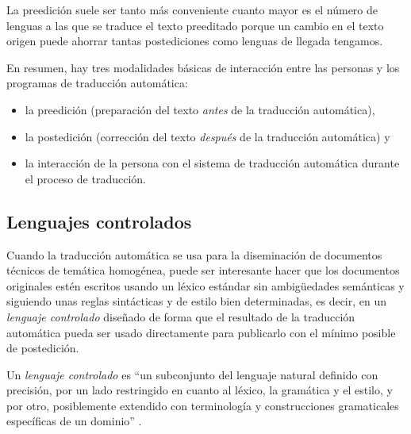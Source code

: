 La preedición suele ser tanto más conveniente cuanto mayor es el número de lenguas a las que se traduce el texto preeditado porque un cambio en el texto origen puede ahorrar tantas postediciones como lenguas de llegada tengamos. 

En resumen, hay tres modalidades básicas de interacción entre las personas y los programas de traducción automática: \begin{itemize} \item la preedición (preparación del texto \emph{antes} de la traducción automática), \item la postedición (corrección del texto \emph{después} de la traducción automática) y \item la interacción de la persona con el sistema de traducción automática durante el proceso de traducción. \end{itemize} 


\subsection{Lenguajes controlados} \label{ss:llecon} Cuando la traducción automática se usa para la diseminación de documentos técnicos de temática homogénea, puede ser interesante hacer que los documentos originales estén escritos usando un léxico estándar sin ambigüedades semánticas y siguiendo unas reglas sintácticas y de estilo bien determinadas, es decir, en un \emph{lenguaje controlado} \citep{wojcik96u,arnold94b,o2003controlling} diseñado de forma que el resultado de la traducción automática pueda ser usado directamente para publicarlo con el mínimo posible de postedición. 

Un \emph{lenguaje controlado} es ``un subconjunto del lenguaje natural definido con precisión, por un lado restringido en cuanto al léxico, la gramática y el estilo, y por otro, posiblemente extendido con terminología y construcciones gramaticales específicas de un dominio'' \citep{huijsen98u}. 

